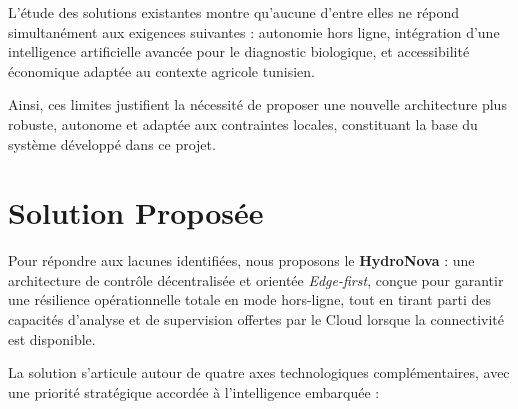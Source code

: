L’étude des solutions existantes montre qu’aucune d’entre elles ne répond simultanément aux exigences suivantes : autonomie hors ligne, intégration d’une intelligence artificielle avancée pour le diagnostic biologique, et accessibilité économique adaptée au contexte agricole tunisien.

Ainsi, ces limites justifient la nécessité de proposer une nouvelle architecture plus robuste, autonome et adaptée aux contraintes locales, constituant la base du système développé dans ce projet.


\section{ Solution Proposée}
	
Pour répondre aux lacunes identifiées, nous proposons le \textbf{HydroNova} : une architecture de contrôle décentralisée et orientée \textit{Edge-first}, conçue pour garantir une résilience opérationnelle totale en mode hors-ligne, tout en tirant parti des capacités d'analyse et de supervision offertes par le Cloud lorsque la connectivité est disponible.

	La solution s'articule autour de quatre axes technologiques complémentaires, avec une priorité stratégique accordée à l'intelligence embarquée :
	
